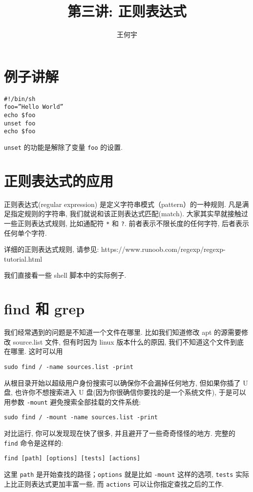 \documentclass[a4paper]{ctexart}
\title{第三讲: 正则表达式}
\author{王何宇}
\date{}
\begin{document}
\maketitle
\pagestyle{empty}

\section{例子讲解}

\begin{verbatim}
#!/bin/sh
foo=”Hello World”
echo $foo
unset foo
echo $foo
\end{verbatim}

\verb|unset| 的功能是解除了变量 \verb|foo| 的设置.



\section{正则表达式的应用}

正则表达式(regular expression) 是定义字符串模式（pattern）的一种规则.
凡是满足指定规则的字符串, 我们就说和该正则表达式匹配(match). 
大家其实早就接触过一些正则表达式规则, 比如通配符 \verb|*| 和 \verb|?|.
前者表示不限长度的任何字符, 后者表示任何单个字符.

详细的正则表达式规则, 请参见: \newline
https://www.runoob.com/regexp/regexp-tutorial.html

我们直接看一些 shell 脚本中的实际例子. 

\section{find 和 grep}

我们经常遇到的问题是不知道一个文件在哪里. 比如我们知道修改 apt 的源需要修改 source.list 文件,
但有时因为 linux 版本什么的原因, 我们不知道这个文件到底在哪里. 这时可以用
\begin{verbatim}
sudo find / -name sources.list -print
\end{verbatim}
从根目录开始以超级用户身份搜索可以确保你不会漏掉任何地方,
但如果你插了 U 盘, 也许你不想搜索进入 U 盘(因为你很确信你要找的是一个系统文件), 于是可以用参数
\verb|-mount| 避免搜索全部挂载的文件系统:
\begin{verbatim}
sudo find / -mount -name sources.list -print
\end{verbatim}
对比运行, 你可以发现现在快了很多, 并且避开了一些奇奇怪怪的地方.
完整的 \verb|find| 命令是这样的:
\begin{verbatim}
find [path] [options] [tests] [actions]
\end{verbatim}
这里 \verb|path| 是开始查找的路径；\verb|options| 就是比如 \verb|-mount|
这样的选项, \verb|tests| 实际上比正则表达式更加丰富一些, 而 \verb|actions|
可以让你指定查找之后的工作.
\end{document}
